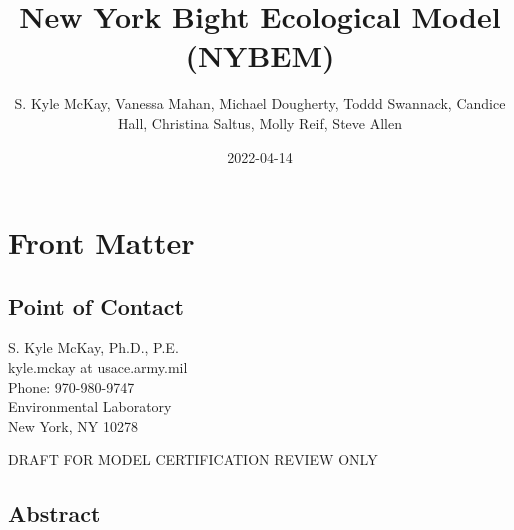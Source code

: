 \documentclass[
]{book}
\title{New York Bight Ecological Model (NYBEM)}
\author{S. Kyle McKay, Vanessa Mahan, Michael Dougherty, Toddd Swannack, Candice Hall, Christina Saltus, Molly Reif, Steve Allen}
\date{2022-04-14}
\begin{document}
\maketitle

{
\setcounter{tocdepth}{1}
\tableofcontents
}
\hypertarget{front-matter}{%
\chapter*{Front Matter}\label{front-matter}}

\hypertarget{point-of-contact}{%
\section*{Point of Contact}\label{point-of-contact}}

S. Kyle McKay, Ph.D., P.E.\\
kyle.mckay at usace.army.mil\\
Phone: 970-980-9747\\
Environmental Laboratory\\
New York, NY 10278

{DRAFT FOR MODEL CERTIFICATION REVIEW ONLY}

\hypertarget{abstract}{%
\section*{Abstract}\label{abstract}}
\end{document}

